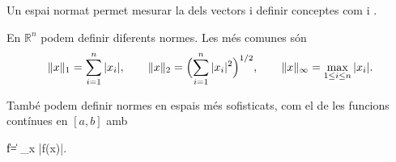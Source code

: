 \begin{frame}

Un espai normat permet mesurar la  dels vectors i definir
conceptes com  i .

\dpause

\begin{example}
En $\mathbb{R}^n$ podem definir diferents normes. Les més comunes són
\[
  \|x\|_1 = \sum_{i=1}^n |x_i|,
  \qquad
  \|x\|_2 = \Bigl(\sum_{i=1}^n |x_i|^2\Bigr)^{1/2},
  \qquad
  \|x\|_\infty = \max_{1 \leq i \leq n} |x_i|.
\]


També podem definir normes en espais més sofisticats, com el de les funcions
contínues en $[a,b]$ amb
\begin{keyformula}
  \|f\| = \max_{x \in [a,b]} |f(x)|.
\end{keyformula}
\end{example}
\end{frame}

